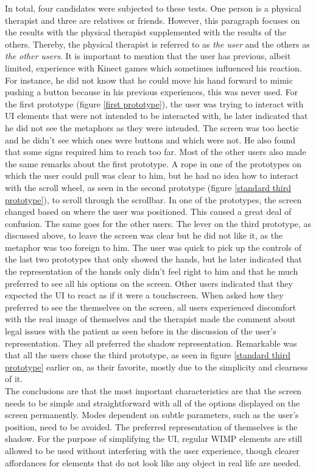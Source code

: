 In total, four candidates were subjected to these tests. One person is a physical therapist and three are relatives or friends. However, this paragraph focuses on the results with the physical therapist supplemented with the results of the others. Thereby, the physical therapist is referred to as \emph{the user} and the others as \emph{the other users}. It is important to mention that the user has previous, albeit limited, experience with Kinect games which sometimes influenced his reaction. For instance, he did not know that he could move his hand forward to mimic pushing a button because in his previous experiences, this was never used. For the first prototype (figure \ref{first prototype}), the user was trying to interact with UI elements that were not intended to be interacted with, he later indicated that he did not see the metaphors as they were intended. The screen was too hectic and he didn't see which ones were buttons and which were not. He also found that some signs required him to reach too far. Most of the other users also made the same remarks about the first prototype. A rope in one of the prototypes on which the user could pull was clear to him, but he had no idea how to interact with the scroll wheel, as seen in the second prototype (figure \ref{standard third prototype}), to scroll through the scrollbar. In one of the prototypes, the screen changed based on where the user was positioned. This caused a great deal of confusion. The same goes for the other users. The lever on the third prototype, as discussed above, to leave the screen was clear but he did not like it, as the metaphor was too foreign to him. The user was quick to pick up the controls of the last two prototypes that only showed the hands, but he later indicated that the representation of the hands only didn't feel right to him and that he much preferred to see all his options on the screen. Other users indicated that they expected the UI to react as if it were a touchscreen. When asked how they preferred to see the themselves on the screen, all users experienced discomfort with the real image of themselves and the therapist made the comment about legal issues with the patient as seen before in the discussion of the user's representation. They all preferred the shadow representation. Remarkable was that all the users chose the third prototype, as seen in figure \ref{standard third prototype} earlier on, as their favorite, mostly due to the simplicity and clearness of it.\\

The conclusions are that the most important characteristics are that the screen needs to be simple and straightforward with all of the options displayed on the screen permanently. Modes dependent on subtle parameters, such as the user's position, need to be avoided. The preferred representation of themselves is the shadow. For the purpose of simplifying the UI, regular WIMP elements are still allowed to be used without interfering with the user experience, though clearer affordances for elements that do not look like any object in real life are needed.\\


